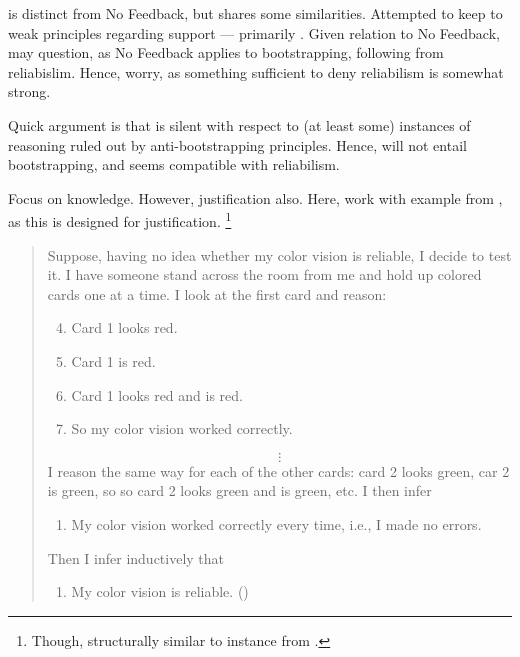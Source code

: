 \begin{note}
  \nI{} is distinct from No Feedback, but shares some similarities.
  Attempted to keep to weak principles regarding support --- primarily \eiS{}.
  Given relation to No Feedback, may question, as No Feedback applies to bootstrapping, following from reliabislim.
  Hence, worry, as something sufficient to deny reliabilism is somewhat strong.

  Quick argument is that \nI{} is silent with respect to (at least some) instances of reasoning ruled out by anti-bootstrapping principles.
  Hence, \nI{} will not entail bootstrapping, and seems compatible with reliabilism.

  Focus on knowledge.
  However, justification also.
  Here, work with example from \textcite{Cohen:2010ux}, as this is designed for justification.\nolinebreak
  \footnote{
    Though, structurally similar to instance from \cite{Vogel:2000tl}.
  }

  \begin{quote}
    Suppose, having no idea whether my color vision is reliable, I decide to test it. I have someone stand across the room from me and hold up colored cards one at a time. I look at the first card and reason:
    \begin{enumerate}[label=(\arabic*)]
      \setcounter{enumi}{3}
    \item Card 1 looks red.
    \item Card 1 is red.
    \item Card 1 looks red and is red.
    \item So my color vision worked correctly.
    \end{enumerate}
    \[\vdots\]
    I reason the same way for each of the other cards: card 2 looks green, car 2 is green, so so card 2 looks green and is green, etc. I then infer

    \begin{enumerate}[label=(\arabic*), resume]
    \item My color vision worked correctly every time, i.e., I made no errors.
    \end{enumerate}

    Then I infer inductively that

    \begin{enumerate}[label=(\arabic*), resume]
    \item My color vision is reliable.\nolinebreak
      \mbox{}\hfill\mbox{(\citeyear[142]{Cohen:2010ux})}
    \end{enumerate}
  \end{quote}


\end{note}
